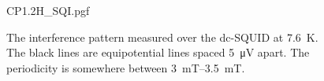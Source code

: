 \begin{figure}[ht]
	\centering
	{CP1.2H_SQI.pgf}
	\caption{The interference pattern measured over the dc-SQUID at \qty{7.6}{\kelvin}. The black lines are equipotential lines spaced \qty{5}{\micro\volt} apart. The periodicity is somewhere between \qtyrange{3}{3.5}{\milli\tesla}.}
\end{figure}


